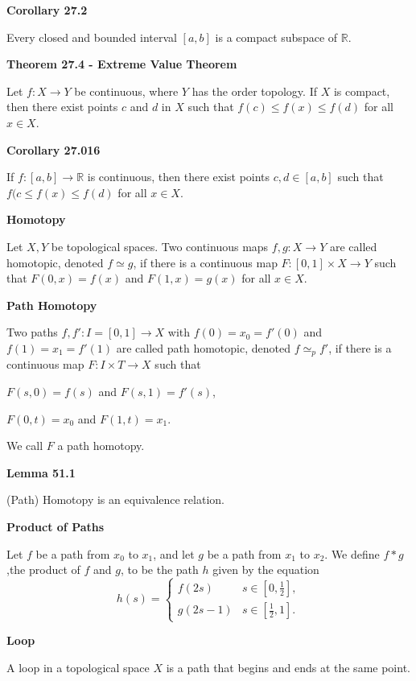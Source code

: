 \documentclass{article}
\begin{document}
\medskip\noindent\textbf{Corollary 27.2}

    Every closed and bounded interval $[a,b]$ is a compact subspace of $\mathbb R$.

\medskip\noindent\textbf{Theorem 27.4 - Extreme Value Theorem}

    Let $f: X \to Y$ be continuous, where $Y$ has the order topology. If $X$ is compact, then there exist points $c$ and $d$ in $X$ such that $f(c) \leq f(x) \leq f(d)$ for all $x \in X$.

\medskip\noindent\textbf{Corollary 27.016}

    If $f: [a,b] \to \mathbb R$ is continuous, then there exist points $c,d \in [a,b]$ such that $f(c \leq f(x) \leq f(d)$ for all $x \in X$.

\medskip\noindent\textbf{Homotopy}

    Let $X, Y$ be topological spaces.
    Two continuous maps $f,g:X \to Y$ are called homotopic, denoted $f \simeq g$, if there is a continuous map $F: [0,1] \times X \to Y$ such that $F(0,x) = f(x)$ and $F(1, x) = g(x)$ for all $x \in X$.

\medskip\noindent\textbf{Path Homotopy}

    Two paths $f, f': I=[0,1] \to X$ with $f(0) = x_0 = f'(0)$ and $f(1) = x_1 = f'(1)$ are called path homotopic, denoted $f \simeq_{p} f'$, if there is a continuous map $F: I \times T \to X$ such that 
    \begin{center}
        $F(s, 0) = f(s)$ and $F(s,1) = f'(s)$,

        $F(0, t) = x_0$ and $F(1, t) = x_1$.
    \end{center}

    We call $F$ a path homotopy.

\medskip\noindent\textbf{Lemma 51.1}

    (Path) Homotopy is an equivalence relation.

\medskip\noindent\textbf{Product of Paths}

    Let $f$ be a path from $x_0$ to $x_1$, and let $g$ be a path from $x_1$ to $x_2$.
    We define $f * g$,the product of $f$ and $g$, to be the path $h$ given by the equation $$h(s) = \begin{cases} f(2s) & s \in [0, \frac12], \\ g(2s-1) & s \in [\frac12, 1]. \end{cases}$$

\medskip\noindent\textbf{Loop}

    A loop in a topological space $X$ is a path that begins and ends at the same point.
\end{document}
